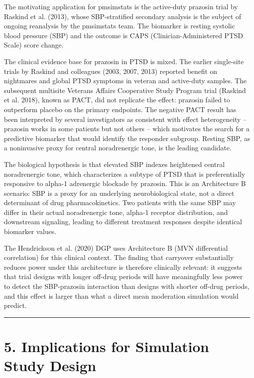 \documentclass[11pt]{article}
\begin{document}
The motivating application for pmsimstats is the active-duty
prazosin trial by Raskind et al. (2013), whose SBP-stratified
secondary analysis is the subject of ongoing reanalysis by the
pmsimstats team.
The biomarker is resting systolic blood pressure (SBP) and the
outcome is CAPS (Clinician-Administered PTSD Scale) score
change.

The clinical evidence base for prazosin in PTSD is mixed. The
earlier single-site trials by Raskind and colleagues (2003,
2007, 2013) reported benefit on nightmares and global PTSD
symptoms in veteran and active-duty samples. The subsequent
multisite Veterans Affairs Cooperative Study Program trial
(Raskind et al. 2018), known as PACT, did not replicate the
effect: prazosin failed to outperform placebo on the primary
endpoints. The negative PACT result has been interpreted by
several investigators as consistent with effect heterogeneity --
prazosin works in some patients but not others -- which
motivates the search for a predictive biomarker that would
identify the responder subgroup. Resting SBP, as a noninvasive
proxy for central noradrenergic tone, is the leading candidate.

The biological hypothesis is that elevated SBP indexes
heightened central noradrenergic tone, which characterizes a
subtype of PTSD that is preferentially responsive to alpha-1
adrenergic blockade by prazosin. This is an Architecture B
scenario: SBP is a proxy for an underlying neurobiological
state, not a direct determinant of drug pharmacokinetics. Two
patients with the same SBP may differ in their actual
noradrenergic tone, alpha-1 receptor distribution, and
downstream signaling, leading to different treatment responses
despite identical biomarker values.

The Hendrickson et al. (2020) DGP uses Architecture B (MVN
differential correlation) for this clinical context. The
finding that carryover substantially reduces power under this
architecture is therefore clinically relevant: it suggests that
trial designs with longer off-drug periods will have
meaningfully less power to detect the SBP-prazosin interaction
than designs with shorter off-drug periods, and this effect is
larger than what a direct mean moderation simulation would
predict.

\bigskip\noindent\rule{\textwidth}{0.4pt}\bigskip

\section{5. Implications for Simulation Study Design}
\end{document}
